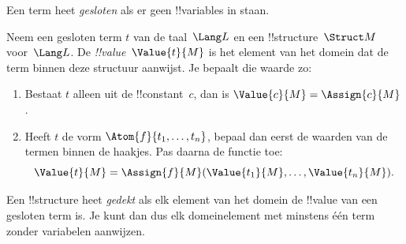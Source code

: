 \documentclass[../../../include/open-logic-section]{subfiles}
\begin{document}


\begin{explain}
Een term heet \emph{gesloten} als er geen !!{variable}s in staan.
\end{explain}

\begin{defn}
Neem een gesloten term $t$ van de taal~$\Lang L$ en een
!!{structure}~$\Struct M$ voor~$\Lang L$. De
\emph{!!{value}}~$\Value{t}{M}$ is het element van het domein dat de
term binnen deze structuur aanwijst. Je bepaalt die waarde zo:
\begin{enumerate}
\item Bestaat $t$ alleen uit de !!{constant}~$c$, dan is
  $\Value{c}{M} = \Assign{c}{M}$.
\item Heeft $t$ de vorm $\Atom{f}{t_1, \ldots, t_n}$, bepaal dan eerst
  de waarden van de termen binnen de haakjes. Pas daarna de functie toe:
  \[
  \Value{t}{M} = \Assign{f}{M}(\Value{t_1}{M}, \ldots,
  \Value{t_n}{M}).
  \]
\end{enumerate}
\end{defn}

\begin{defn}
Een !!{structure} heet \emph{gedekt} als elk element van het domein de
!!{value} van een gesloten term is. Je kunt dan dus elk domeinelement
met minstens één term zonder variabelen aanwijzen.
\end{defn}
\end{document}
